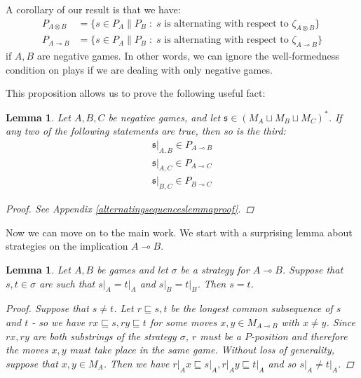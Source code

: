 \documentclass[11pt]{article} %
\theoremstyle{plain} %
\newtheorem{lemma}[theorem]{Lemma}
\theoremstyle{definition} %
\theoremstyle{note}
\theoremstyle{exercisestyle}
\newcommand{\tensor}{\otimes}
\renewcommand{\implies}{\multimap}
\newcommand{\cprd}{\sqcup}
\newcommand{\suchthat}{\;\colon\;}
\newcommand{\s}{\mathfrak s}
\newcommand{\prefix}{\sqsubseteq}
\begin{document}
A corollary of our result is that we have:
\begin{align*}
  P_{A\tensor B} & = \{s\in P_A\|P_B\suchthat \textrm{$s$ is alternating with respect to $\zeta_{A\tensor B}$}\} \\
  P_{A\implies B} & = \{s\in P_A\|P_B\suchthat \textrm{$s$ is alternating with respect to $\zeta_{A\implies B}$}\}
\end{align*}
if $A,B$ are negative games.  In other words, we can ignore the well-formedness condition on plays if we are dealing with only negative games.

This proposition allows us to prove the following useful fact:

\begin{lemma}
  \label{alternatingsequenceslemma}
  Let $A,B,C$ be negative games, and let $\s\in (M_A\cprd M_B\cprd M_C)^*$.  If any two of the following statements are true, then so is the third:
  \begin{gather*}
    \s\vert_{A,B}\in P_{A\implies B}\\
    \s\vert_{A,C}\in P_{A\implies C}\\
    \s\vert_{B,C}\in P_{B\implies C}
  \end{gather*}
  \begin{proof}
    See Appendix \ref{alternatingsequenceslemmaproof}.
  \end{proof}
\end{lemma}

Now we can move on to the main work.  We start with a surprising lemma about strategies on the implication $A\implies B$.  

\begin{lemma}
  \label{PlayInStrategyDeterminedByComponents}
  Let $A,B$ be games and let $\sigma$ be a strategy for $A\implies B$.  Suppose that $s,t\in\sigma$ are such that $s\vert_A=t\vert_A$ and $s\vert_B=t\vert_B$.  Then $s=t$.
  \begin{proof}
    Suppose that $s\ne t$.  Let $r\prefix s,t$ be the longest common subsequence of $s$ and $t$ - so we have $rx\prefix s, ry\prefix t$ for some moves $x,y\in M_{A\implies B}$ with $x\ne y$.  Since $rx,ry$ are both substrings of the strategy $\sigma$, $r$ must be a $P$-position and therefore the moves $x,y$ must take place in the same game.  Without loss of generality, suppose that $x,y\in M_A$.  Then we have $r\vert_A x\prefix s\vert_A,r\vert_Ay\prefix t\vert_A$ and so $s\vert_A\ne t\vert_A$.
  \end{proof}
\end{lemma}
\end{document}
